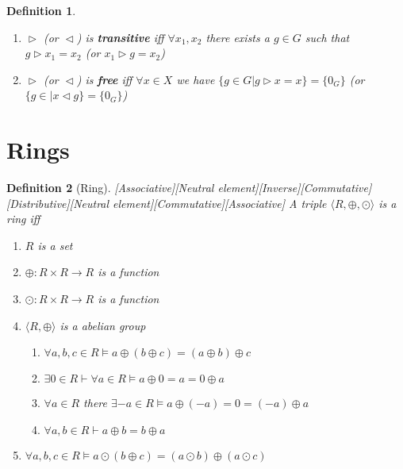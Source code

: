 \documentclass{book}
\newcommand{\tmstrong}[1]{\textbf{#1}}
\newcommand{\um}{-}
\newtheorem{definition}{Definition}
{\theorembodyfont{\rmfamily}\newtheorem{example}{Example}}
\begin{document}
{{\begin{definition}
\begin{enumerate}
    \item $\vartriangleright$ (or $\vartriangleleft$) is
    {\tmstrong{transitive}} iff $\forall x_1, x_2$ there exists a $g \in G$
    such that $g \vartriangleright x_1 = x_2$ (or $x_1 \vartriangleright g =
    x_2$)
    
    \item $\vartriangleright$ (or $\vartriangleleft$) is {\tmstrong{free}} iff
    $\forall x \in X$ we have $\{ g \in G|g \vartriangleright x = x \} = \{
    0_G \}$ (or $\{ g \in |x \vartriangleleft g \} = \{ 0_G \}$)
  \end{enumerate}
\end{definition}

\section{Rings}

\begin{definition}[Ring][Associative][Neutral
element][Inverse][Commutative][Distributive][Neutral
element][Commutative][Associative]
  \label{ring}{}A triple $\langle R, \oplus, \odot \rangle$ is a
  ring iff
  \begin{enumerate}
    \item $R$ is a set
    
    \item $\oplus : R \times R \rightarrow R$ is a function
    
    \item $\odot : R \times R \rightarrow R$ is a function
    
    \item $\langle R, \oplus \rangle$ is a abelian group
    \begin{enumerate}
      \item $\forall a, b, c \in R \vDash a \oplus (b \oplus c) = (a \oplus b)
      \oplus c$
      
      \item $\exists 0 \in R \vdash \forall a \in R \vDash a \oplus 0 = a = 0
      \oplus a$
      
      \item $\forall a \in R$ there $\exists \um a \in R \vDash a \oplus (\um
      a) = 0 = (\um a) \oplus a$
      
      \item $\forall a, b \in R \vdash a \oplus b = b \oplus a$
    \end{enumerate}
    \item $\forall a, b, c \in R \vDash a \odot (b \oplus c) = (a \odot b)
    \oplus (a \odot c)$
    

\end{enumerate}
\end{definition}}}
\end{document}

